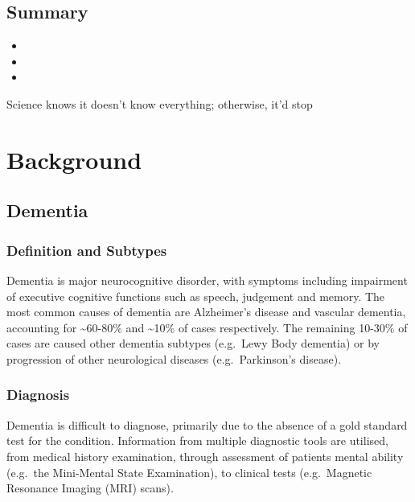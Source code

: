 \documentclass[a4paper, twoside]{templates/ociamthesis}
\begin{document}
\hypertarget{summary}{%
\section{Summary}\label{summary}}

\begin{itemize}
\item
\item
\item
\end{itemize}

\begin{savequote}
Science knows it doesn't know everything; otherwise, it'd stop
\end{savequote}



\hypertarget{background-heading}{%
\chapter{Background}\label{background-heading}}

\minitoc 

\hypertarget{dementia}{%
\section{Dementia}\label{dementia}}

\hypertarget{definition-and-subtypes}{%
\subsection{Definition and Subtypes}\label{definition-and-subtypes}}

Dementia is major neurocognitive disorder, with symptoms including impairment of executive cognitive functions such as speech, judgement and memory. The most common causes of dementia are Alzheimer's disease and vascular dementia, accounting for \textasciitilde60-80\% and \textasciitilde10\% of cases respectively. The remaining 10-30\% of cases are caused other dementia subtypes (e.g.~Lewy Body dementia) or by progression of other neurological diseases (e.g.~Parkinson's disease).

\hypertarget{diagnosis}{%
\subsection{Diagnosis}\label{diagnosis}}

Dementia is difficult to diagnose, primarily due to the absence of a gold standard test for the condition. Information from multiple diagnostic tools are utilised, from medical history examination, through assessment of patients mental ability (e.g.~the Mini-Mental State Examination), to clinical tests (e.g.~Magnetic Resonance Imaging (MRI) scans).
\end{document}
